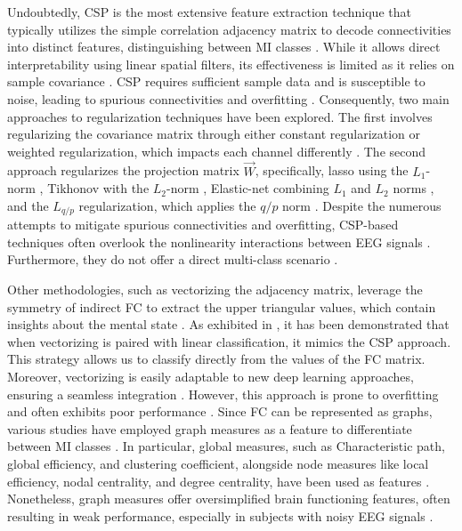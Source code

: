 Undoubtedly, CSP is the most extensive feature extraction technique that typically utilizes the simple correlation adjacency matrix to decode connectivities into distinct features, distinguishing between MI classes \cite{miljevic2022electroencephalographic, guo2020eeg}. While it allows direct interpretability using linear spatial filters, its effectiveness is limited as it relies on sample covariance \cite{akuthota2023eeg, darvish2021correlation}. CSP requires sufficient sample data and is susceptible to noise, leading to spurious connectivities and overfitting \cite{khademi2023review}. Consequently, two main approaches to regularization techniques have been explored. The first involves regularizing the covariance matrix through either constant regularization \cite{park2017filter} or weighted regularization, which impacts each channel differently \cite{deng2020local}. The second approach regularizes the projection matrix $\Vec{W}$, specifically, lasso using the $L_1$-norm \cite{zhang2018new}, Tikhonov with the $L_2$-norm \cite{fauzi2019energy}, Elastic-net combining $L_1$ and $L_2$ norms \cite{gu2021common}, and the $L_{q/p}$ regularization, which applies the $q/p$ norm \cite{cai2021single}. Despite the numerous attempts to mitigate spurious connectivities and overfitting, CSP-based techniques often overlook the nonlinearity interactions between EEG signals \cite{ghanbar2021correlation}. Furthermore, they do not offer a direct multi-class scenario \cite{alizadeh2023multi}. 

Other methodologies, such as vectorizing the adjacency matrix, leverage the symmetry of indirect FC to extract the upper triangular values, which contain insights about the mental state \cite{meng2023rhythmic, georgiadis2018exploiting}. As exhibited in \cite{reuderink2011subject}, it has been demonstrated that when vectorizing is paired with linear classification, it mimics the CSP approach. This strategy allows us to classify directly from the values of the FC matrix. Moreover, vectorizing is easily adaptable to new deep learning approaches, ensuring a seamless integration \cite{zoumpourlis2022covmix}. However, this approach is prone to overfitting and often exhibits poor performance \cite{xu2020tangent}. Since FC can be represented as graphs, various studies have employed graph measures as a feature to differentiate between MI classes \cite{gu2023decoding}. In particular, global measures, such as Characteristic path, global efficiency, and clustering coefficient, alongside node measures like local efficiency, nodal centrality, and degree centrality, have been used as features \cite{desbois2021functional, rodrigues2022can}. Nonetheless, graph measures offer oversimplified brain functioning features, often resulting in weak performance, especially in subjects with noisy EEG signals \cite{gonzalez2020network}.

